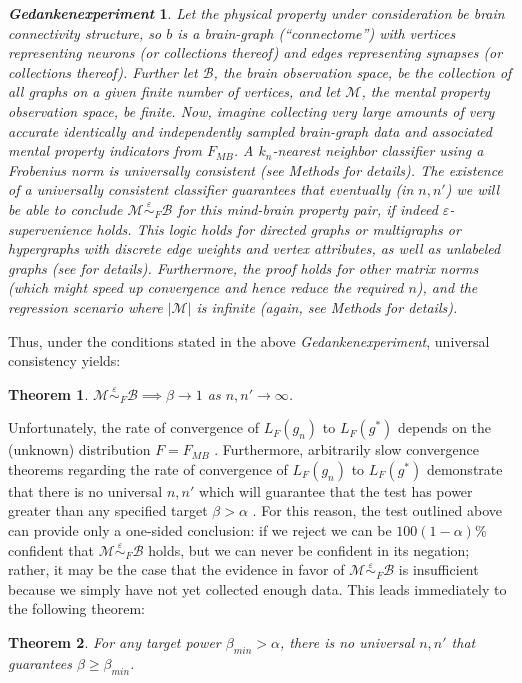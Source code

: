 \documentclass{article}
\newcommand{\conv}{\rightarrow}
\newcommand{\mB}{\mathcal{B}}
\newcommand{\mM}{\mathcal{M}}
\providecommand{\mc}[1]{\mathcal{#1}}
\newcommand{\MeB}{\mM \overset{\varepsilon}{{\sim}}_{F} \mB}
\providecommand{\tr}[1]{\textcolor{black}{#1}}
\newtheorem{thm}{Theorem}
\newtheorem{thex}{\emph{Gedankenexperiment}}
\begin{document}
\begin{thex} \label{exp:1}
Let the physical property under consideration be brain connectivity structure, so $b$ is a brain-graph (``connectome'') with vertices representing neurons (or collections thereof) and edges representing synapses (or collections thereof). Further let $\mB$, the brain observation space, be the collection of all graphs on a given finite number of vertices, and let $\mc{M}$, the mental property observation space, be finite. Now, imagine collecting very large amounts of very accurate identically and independently sampled  brain-graph data and associated mental property indicators from $F_{MB}$. A $k_n$-nearest neighbor classifier using a Frobenius norm is universally consistent (see Methods for details). 
The existence of a universally consistent classifier guarantees that eventually (in $n,n'$) we will be able to conclude $\MeB$ for this mind-brain property pair, if indeed $\varepsilon$-supervenience holds. This logic holds for directed graphs or multigraphs or hypergraphs with discrete edge weights and vertex attributes, as well as unlabeled graphs (see \cite{VP11_unlabeled} for details). Furthermore, the proof holds for other matrix norms (which might speed up convergence and hence reduce the required $n$), and the regression scenario where $|\mM|$ is infinite (again, see Methods for details).  
\end{thex}
Thus, under the conditions stated in the above \emph{Gedankenexperiment}, universal consistency yields:
\begin{thm} \label{thm:3}
	$\MeB \implies \beta \conv 1$ as $n,n'\conv \infty$.
\end{thm}


Unfortunately, the rate of convergence of $L_{F}(g_n)$ to $L_{F}(g^*)$ depends on the (unknown) distribution $F=F_{MB}$ \cite{DGL96}. Furthermore, arbitrarily slow convergence theorems regarding the rate of convergence of $L_{F}(g_n)$ to $L_{F}(g^*)$ demonstrate that there is no universal $n,n'$ which will guarantee that the test has power greater than any specified target $\beta > \alpha$ \cite{Devroye83}. For this reason, the test outlined above can provide only a one-sided conclusion: if we reject we can be $100(1-\alpha)$\% confident that $\MeB$ holds, but we can never be confident in its negation; rather, it may be the case that the evidence in favor of $\MeB$ is insufficient 
because we simply have not yet collected enough data. 
This leads immediately to the following theorem:
\begin{thm} \label{thm:4}
For any target power $\beta_{min} > \alpha$, there is no universal $n,n'$ that guarantees $\beta \geq \beta_{min}$.
\end{thm}
\end{document}

